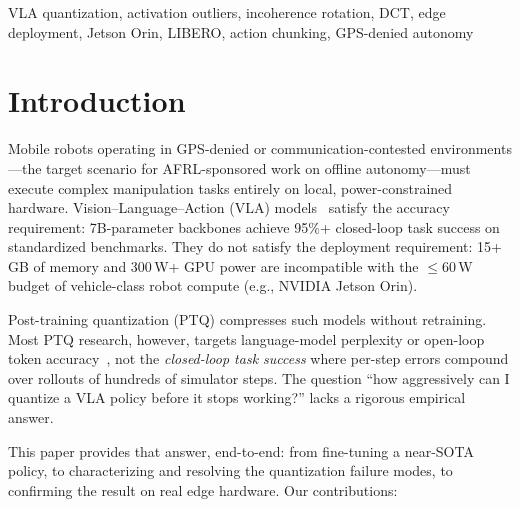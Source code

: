 \documentclass[conference]{IEEEtran}
\begin{document}
\begin{IEEEkeywords}
VLA quantization, activation outliers, incoherence rotation, DCT, edge deployment,
Jetson Orin, LIBERO, action chunking, GPS-denied autonomy
\end{IEEEkeywords}

\section{Introduction}
\label{sec:intro}

Mobile robots operating in GPS-denied or communication-contested environments---the target
scenario for AFRL-sponsored work on offline autonomy---must execute complex manipulation
tasks entirely on local, power-constrained hardware. Vision--Language--Action (VLA)
models~\cite{openvla,openvlaoft} satisfy the accuracy requirement: 7B-parameter backbones
achieve 95\%+ closed-loop task success on standardized benchmarks. They do not satisfy the
deployment requirement: 15+ GB of memory and 300\,W+ GPU power are incompatible with the
$\leq$60\,W budget of vehicle-class robot compute (e.g., NVIDIA Jetson Orin).

Post-training quantization (PTQ) compresses such models without retraining. Most PTQ
research, however, targets language-model perplexity or open-loop token
accuracy~\cite{gptq,awq,smoothquant,quarot,spinquant}, not the \emph{closed-loop task
success} where per-step errors compound over rollouts of hundreds of simulator steps. The
question ``how aggressively can I quantize a VLA policy before it stops working?'' lacks a
rigorous empirical answer.

This paper provides that answer, end-to-end: from fine-tuning a near-SOTA policy, to
characterizing and resolving the quantization failure modes, to confirming the result on
real edge hardware. Our contributions:
\end{document}
